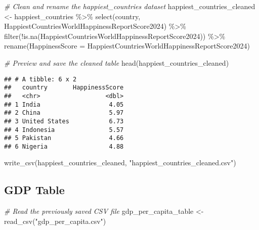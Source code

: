 \documentclass[
]{article}
\newenvironment{Shaded}{\begin{snugshade}}{\end{snugshade}}
\newcommand{\AttributeTok}[1]{\textcolor[rgb]{0.77,0.63,0.00}{#1}}
\newcommand{\CommentTok}[1]{\textcolor[rgb]{0.56,0.35,0.01}{\textit{#1}}}
\newcommand{\FunctionTok}[1]{\textcolor[rgb]{0.00,0.00,0.00}{#1}}
\newcommand{\NormalTok}[1]{#1}
\newcommand{\OtherTok}[1]{\textcolor[rgb]{0.56,0.35,0.01}{#1}}
\newcommand{\SpecialCharTok}[1]{\textcolor[rgb]{0.00,0.00,0.00}{#1}}
\newcommand{\StringTok}[1]{\textcolor[rgb]{0.31,0.60,0.02}{#1}}
\begin{document}
\begin{Shaded}
\begin{Highlighting}[]
\CommentTok{\# Clean and rename the happiest\_countries dataset}
\NormalTok{happiest\_countries\_cleaned }\OtherTok{\textless{}{-}}\NormalTok{ happiest\_countries }\SpecialCharTok{\%\textgreater{}\%}
  \FunctionTok{select}\NormalTok{(country, HappiestCountriesWorldHappinessReportScore2024) }\SpecialCharTok{\%\textgreater{}\%} 
  \FunctionTok{filter}\NormalTok{(}\SpecialCharTok{!}\FunctionTok{is.na}\NormalTok{(HappiestCountriesWorldHappinessReportScore2024)) }\SpecialCharTok{\%\textgreater{}\%} 
  \FunctionTok{rename}\NormalTok{(}\AttributeTok{HappinessScore =}\NormalTok{ HappiestCountriesWorldHappinessReportScore2024) }

\CommentTok{\# Preview and save the cleaned table}
\FunctionTok{head}\NormalTok{(happiest\_countries\_cleaned)}
\end{Highlighting}
\end{Shaded}

\begin{verbatim}
## # A tibble: 6 x 2
##   country       HappinessScore
##   <chr>                  <dbl>
## 1 India                   4.05
## 2 China                   5.97
## 3 United States           6.73
## 4 Indonesia               5.57
## 5 Pakistan                4.66
## 6 Nigeria                 4.88
\end{verbatim}

\begin{Shaded}
\begin{Highlighting}[]
\FunctionTok{write\_csv}\NormalTok{(happiest\_countries\_cleaned, }\StringTok{"happiest\_countries\_cleaned.csv"}\NormalTok{)}
\end{Highlighting}
\end{Shaded}

\hypertarget{gdp-table}{%
\subsection{GDP Table}\label{gdp-table}}

\begin{Shaded}
\begin{Highlighting}[]
\CommentTok{\# Read the previously saved CSV file}
\NormalTok{gdp\_per\_capita\_table }\OtherTok{\textless{}{-}} \FunctionTok{read\_csv}\NormalTok{(}\StringTok{"gdp\_per\_capita.csv"}\NormalTok{)}
\end{Highlighting}
\end{Shaded}
\end{document}

